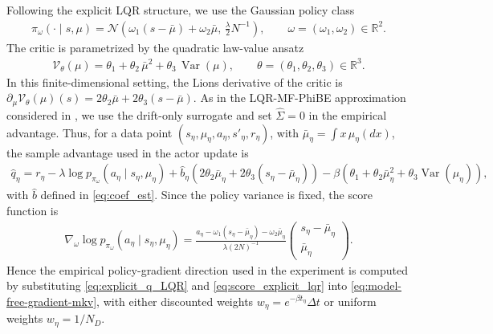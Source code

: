 \documentclass[a4paper, 10pt, english, reqno]{amsart}
\begin{document}
Following the explicit LQR structure, we use the Gaussian policy class
\begin{align}\label{eq:definition_paramtric_policy_ex1}
     \pi_\omega(\cdot\mid s,\mu)
  =
  \mathcal N\left(
    \omega_1(s-\bar\mu)+\omega_2\bar\mu,\,
    \frac{\lambda}{2}N^{-1}
  \right),
  \qquad
  \omega=(\omega_1,\omega_2)\in\mathbb R^2.
\end{align}
The critic is parametrized by the quadratic law-value ansatz
\begin{align}\label{eq:value_anzatz_ex1}
      \mathcal V_\theta(\mu)
  =
  \theta_1+\theta_2\,\bar\mu^2+\theta_3\,\operatorname{Var}(\mu),
  \qquad
  \theta=(\theta_1,\theta_2,\theta_3)\in\mathbb R^3.
\end{align}
In this finite-dimensional setting, the Lions derivative of the critic is $\partial_\mu \mathcal V_\theta(\mu)(s)
  =
  2\theta_2\bar\mu
  +
  2\theta_3(s-\bar\mu).$ As in the LQR-MF-PhiBE approximation considered in , we use the drift-only surrogate and set $\widehat\Sigma=0$ in the empirical advantage. Thus, for a data point $(s_\eta,\mu_\eta,a_\eta,s'_\eta,r_\eta)$, with $\bar\mu_\eta=\int x\,\mu_\eta(dx)$, the sample advantage used in the actor update is
\begin{align}\label{eq:explicit_q_LQR}
      \widehat q_\eta
  =
  r_\eta
  -
  \lambda\log p_{\pi_\omega}(a_\eta\mid s_\eta,\mu_\eta)
  +\widehat b_\eta
\left(2\theta_2\bar\mu_\eta+2\theta_3(s_\eta-\bar\mu_\eta)\right)
-\beta\left(
\theta_1+\theta_2\bar\mu_\eta^2
+\theta_3\operatorname{Var}(\mu_\eta)
\right),
\end{align}
 with $\hat{b}$ defined in \eqref{eq:coef_est}. Since the policy variance is fixed, the score function is
\begin{align}\label{eq:score_explicit_lqr}
  \nabla_\omega\log p_{\pi_\omega}(a_\eta\mid s_\eta,\mu_\eta)
  =
  \frac{a_\eta-\omega_1(s_\eta-\bar\mu_\eta)-\omega_2\bar\mu_\eta}
       {\lambda(2N)^{-1}}
  \begin{pmatrix}
    s_\eta-\bar\mu_\eta\\
    \bar\mu_\eta
  \end{pmatrix}.
\end{align}
Hence the empirical policy-gradient direction used in the experiment is computed by substituting \eqref{eq:explicit_q_LQR} and \eqref{eq:score_explicit_lqr} into \eqref{eq:model-free-gradient-mkv}, with either discounted weights $w_\eta=e^{-\beta t_\eta}\Delta t$ or uniform weights $w_\eta=1/N_D$.
\end{document}
